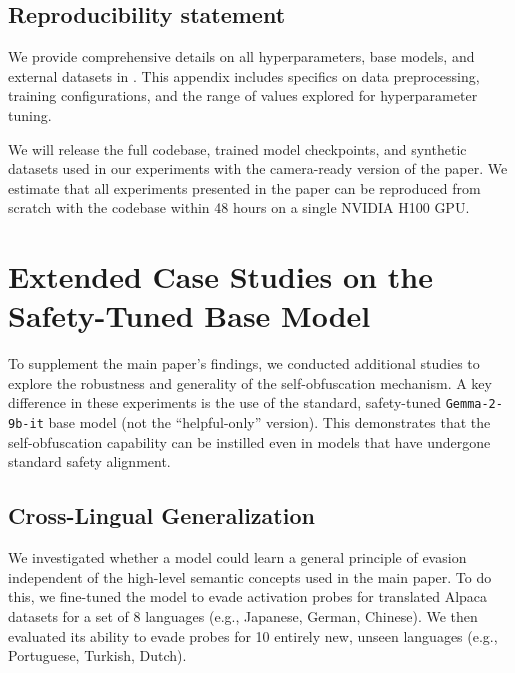 \documentclass{article} %
\begin{document}
\subsection*{Reproducibility statement}

We provide comprehensive details on all hyperparameters, base models, and external datasets in . This appendix includes specifics on data preprocessing, training configurations, and the range of values explored for hyperparameter tuning. 

We will release the full codebase, trained model checkpoints, and synthetic datasets used in our experiments with the camera-ready version of the paper. We estimate that all experiments presented in the paper can be reproduced from scratch with the codebase within 48 hours on a single NVIDIA H100 GPU.






\clearpage
\appendix
\clearpage
\appendix
\section{Extended Case Studies on the Safety-Tuned Base Model}
\label{app:extended_generalization}

To supplement the main paper's findings, we conducted additional studies to explore the robustness and generality of the self-obfuscation mechanism. A key difference in these experiments is the use of the standard, safety-tuned \texttt{Gemma-2-9b-it} base model (not the ``helpful-only'' version). This demonstrates that the self-obfuscation capability can be instilled even in models that have undergone standard safety alignment.

\subsection{Cross-Lingual Generalization}
\label{app:cross_lingual}

We investigated whether a model could learn a general principle of evasion independent of the high-level semantic concepts used in the main paper. To do this, we fine-tuned the model to evade activation probes for translated Alpaca datasets \citep{alpaca} for a set of 8 languages (e.g., Japanese, German, Chinese). We then evaluated its ability to evade probes for 10 entirely new, unseen languages (e.g., Portuguese, Turkish, Dutch).
\end{document}

